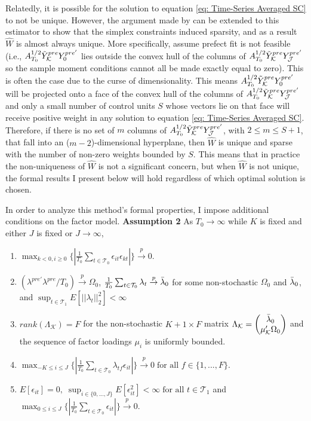 \documentclass{article}
\begin{document}
 Relatedly, it is possible for the solution to equation \eqref{eq: Time-Series Averaged SC} to not be unique. However, the argument made by \cite{LitReview} can be extended to this estimator to show that the simplex constraints induced sparsity, and as a result $\hat{W}$ is almost always unique. More specifically, assume prefect fit is not feasible (i.e., $A_{T_0}^{1/2}\Tilde{Y}_{\mathcal{K}}^{pre}Y_0^{pre'}$ lies outside the convex hull of the columns of $A_{T_0}^{1/2}\Tilde{Y}_{\mathcal{K}}^{pre}Y_{\mathcal{J}}^{pre'}$ so the sample moment conditions cannot all be made exactly equal to zero). This is often the case due to the curse of dimensionality. This means $A_{T_0}^{1/2}\Tilde{Y}_{\mathcal{K}}^{pre}Y_0^{pre'}$ will be projected onto a face of the convex hull of the columns of $A_{T_0}^{1/2}\Tilde{Y}_{\mathcal{K}}^{pre}Y_{\mathcal{J}}^{pre'}$ and only a small number of control units $S$ whose vectors lie on that face will receive positive weight in any solution to equation \eqref{eq: Time-Series Averaged SC}. Therefore, if there is no set of $m$ columns of $A_{T_0}^{1/2}\Tilde{Y}_{\mathcal{K}}^{pre}Y_{\mathcal{J}}^{pre'}$, with $2 \leq m \leq S + 1$, that fall into an ($m-2$)-dimensional hyperplane, then $\hat{W}$ is unique and sparse with the number of non-zero weights bounded by $S$. This means that in practice the non-uniqueness of $\hat{W}$ is not a significant concern, but when $\hat{W}$ is not unique, the formal results I present below will hold regardless of which optimal solution is chosen.
\par 
In order to analyze this method's formal properties, I impose additional conditions on the factor model.
\textbf{Assumption 2} \label{A2} As $T_0 \rightarrow \infty$ while $K$ is fixed and either $J$ is fixed or $J \rightarrow \infty$, 
\begin{enumerate}
    \item $\max_{k <0, i \geq 0} \{ | \frac{1}{T_0} \sum_{t \in \mathcal{T}_0} \epsilon_{it}\epsilon_{kt} | \} \overset{p}{\rightarrow} 0$.
    \item $(\lambda^{pre'}\lambda^{pre}/T_0) \overset{p}{\rightarrow} \Omega_0$, $\frac{1}{T_0}\sum_{t \in \mathcal{T}_0} \lambda_t \overset{p}{\rightarrow} \Bar{\lambda}_0$ for some non-stochastic $\Omega_0$ and $\Bar{\lambda}_0$, and $\sup_{t \in \mathcal{T}_1} E[||\lambda_t ||_2^2] < \infty$
    \item $rank(\Lambda_{\mathcal{K}} ) = F$ for the non-stochastic $K+1 \times F$ matrix $\Lambda_{\mathcal{K}} = \begin{pmatrix}     \Bar{\lambda}_0 \\ \mu_{\mathcal{K}}' \Omega_0   \end{pmatrix}$ and the sequence of factor loadings $\mu_i$ is uniformly bounded.
    \item $\max_{-K \leq i \leq J} \{ | \frac{1}{T_0} \sum_{t \in \mathcal{T}_0} \lambda_{tf} \epsilon_{it} | \} \overset{p}{\rightarrow} 0 \; \text{for all } f \in \{1,...,F\}$.
    \item $E[\epsilon_{it}] = 0,  \; 
\sup_{i \in \{0,...,J\}} E[\epsilon_{it}^2] < \infty \; \text{for all } t \in \mathcal{T}_1$ and $\max_{0 \leq i \leq J} \{| \frac{1}{T_0} \sum_{t \in \mathcal{T}_0} \epsilon_{it} | \} \overset{p}{\rightarrow} 0$.
\end{enumerate}
\end{document}
